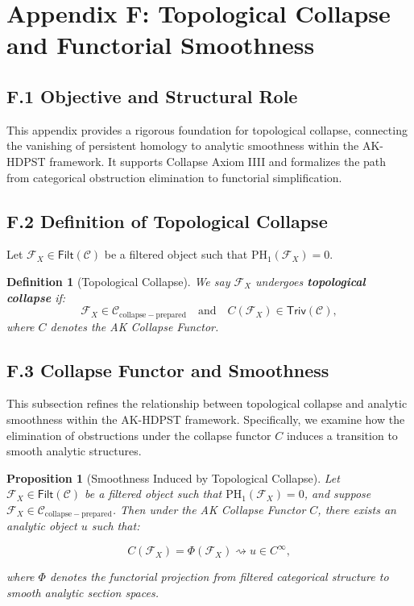 \documentclass[11pt]{article}
\newtheorem{definition}[theorem]{Definition}
\newtheorem{proposition}[theorem]{Proposition}
\begin{document}
\section*{Appendix F: Topological Collapse and Functorial Smoothness}

\subsection*{F.1 Objective and Structural Role}

This appendix provides a rigorous foundation for topological collapse, connecting the vanishing of persistent homology to analytic smoothness within the AK-HDPST framework. It supports Collapse Axiom IIII and formalizes the path from categorical obstruction elimination to functorial simplification.

\subsection*{F.2 Definition of Topological Collapse}

Let \( \mathcal{F}_X \in \mathsf{Filt}(\mathcal{C}) \) be a filtered object such that \( \mathrm{PH}_1(\mathcal{F}_X) = 0 \).

\begin{definition}[Topological Collapse]
We say \( \mathcal{F}_X \) undergoes \textbf{topological collapse} if:
\[
\mathcal{F}_X \in \mathcal{C}_{\mathrm{collapse-prepared}} \quad \text{and} \quad C(\mathcal{F}_X) \in \mathsf{Triv}(\mathcal{C}),
\]
where \( C \) denotes the AK Collapse Functor.
\end{definition}

\subsection*{F.3 Collapse Functor and Smoothness}

This subsection refines the relationship between topological collapse and analytic smoothness within the AK-HDPST framework. Specifically, we examine how the elimination of obstructions under the collapse functor \( C \) induces a transition to smooth analytic structures.

\begin{proposition}[Smoothness Induced by Topological Collapse]
\label{prop:smoothness-collapse}
Let \( \mathcal{F}_X \in \mathsf{Filt}(\mathcal{C}) \) be a filtered object such that \( \mathrm{PH}_1(\mathcal{F}_X) = 0 \), and suppose \( \mathcal{F}_X \in \mathcal{C}_{\mathrm{collapse-prepared}} \). Then under the AK Collapse Functor \( C \), there exists an analytic object \( u \) such that:

\[
C(\mathcal{F}_X) = \Phi(\mathcal{F}_X) \rightsquigarrow u \in C^\infty,
\]

where \( \Phi \) denotes the functorial projection from filtered categorical structure to smooth analytic section spaces.
\end{proposition}
\end{document}
